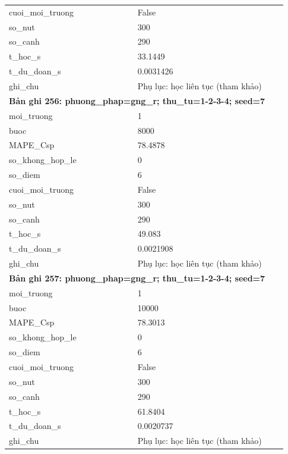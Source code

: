 \begin{longtable}{p{0.43\linewidth}p{0.50\linewidth}}
cuoi\_\allowbreak moi\_\allowbreak truong & False \\
so\_\allowbreak nut & 300 \\
so\_\allowbreak canh & 290 \\
t\_\allowbreak hoc\_\allowbreak s & 33.1449 \\
t\_\allowbreak du\_\allowbreak doan\_\allowbreak s & 0.0031426 \\
ghi\_\allowbreak chu & Phụ lục: học liên tục (tham khảo) \\
\midrule
\multicolumn{2}{p{0.95\linewidth}}{\textbf{Bản ghi 256: phuong\_phap=gng\_r; thu\_tu=1-2-3-4; seed=7}} \\
moi\_\allowbreak truong & 1 \\
buoc & 8000 \\
MAPE\_\allowbreak Csp & 78.4878 \\
so\_\allowbreak khong\_\allowbreak hop\_\allowbreak le & 0 \\
so\_\allowbreak diem & 6 \\
cuoi\_\allowbreak moi\_\allowbreak truong & False \\
so\_\allowbreak nut & 300 \\
so\_\allowbreak canh & 290 \\
t\_\allowbreak hoc\_\allowbreak s & 49.083 \\
t\_\allowbreak du\_\allowbreak doan\_\allowbreak s & 0.0021908 \\
ghi\_\allowbreak chu & Phụ lục: học liên tục (tham khảo) \\
\midrule
\multicolumn{2}{p{0.95\linewidth}}{\textbf{Bản ghi 257: phuong\_phap=gng\_r; thu\_tu=1-2-3-4; seed=7}} \\
moi\_\allowbreak truong & 1 \\
buoc & 10000 \\
MAPE\_\allowbreak Csp & 78.3013 \\
so\_\allowbreak khong\_\allowbreak hop\_\allowbreak le & 0 \\
so\_\allowbreak diem & 6 \\
cuoi\_\allowbreak moi\_\allowbreak truong & False \\
so\_\allowbreak nut & 300 \\
so\_\allowbreak canh & 290 \\
t\_\allowbreak hoc\_\allowbreak s & 61.8404 \\
t\_\allowbreak du\_\allowbreak doan\_\allowbreak s & 0.0020737 \\
ghi\_\allowbreak chu & Phụ lục: học liên tục (tham khảo) \\

\end{longtable}
